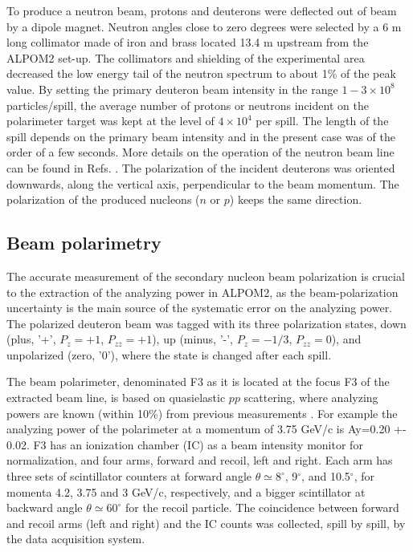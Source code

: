 \documentclass[epj]{svjour}
\begin{document}
To produce a neutron beam, protons and deuterons were deflected out of beam by a dipole magnet.  Neutron angles close to zero degrees were selected by a 6 m long collimator made of iron and brass located 13.4 m upstream from the ALPOM2 set-up. The collimators and shielding of the experimental area decreased the low energy tail of the neutron spectrum to about 1\% of 
the peak value.  By setting the primary deuteron beam intensity in the range $ {1-3\times 10^8}$ particles/spill, the average number of protons or neutrons incident on the polarimeter target was kept at the level of $4\times 10^4$ per spill. The length of the spill depends on the primary beam intensity and in the present case was of the order of a few seconds. More details on the operation of the neutron beam line can be found  in Refs. \cite{Kirillov:1996zf,Rukoyatkin:2001nd}.
The polarization of the incident deuterons was oriented downwards, along the vertical axis, perpendicular  to the beam momentum. The polarization of the produced nucleons ($n$ or $p$) keeps the same direction.
\subsection{Beam polarimetry}
The accurate measurement of the secondary nucleon beam polarization is crucial to the extraction of the analyzing power in ALPOM2, as the beam-polarization uncertainty is the main source of the systematic error on the analyzing power. The polarized deuteron beam was tagged with its three polarization states, down (plus, '+', $P_z=+1$, $P_{zz}=+1$), up (minus, '-', $P_z=-1/3$, $P_{zz}=0$), and unpolarized (zero, '0'), where the state is changed after each spill. 

The beam polarimeter, denominated F3 as it is located at the focus F3 of the extracted beam line, is based on quasielastic $pp$   scattering, where analyzing powers are known (within 10\%) from previous measurements \cite{Bystricky:1981}. For example the analyzing power of the polarimeter at a momentum of 3.75 GeV/c is Ay=0.20 +- 0.02. F3 has an ionization chamber (IC) as a beam intensity monitor for normalization, and four arms, forward and recoil, left and right. Each arm has three sets of scintillator counters at forward angle $\theta \simeq 8^\circ$,  9$^\circ$,  and 10.5$^\circ$, for momenta 4.2, 3.75 and 3 GeV/c, respectively,  and a bigger scintillator at backward angle $\theta \simeq 60^\circ$ for the recoil particle. The coincidence between forward and recoil arms (left and right) and the IC counts was collected, spill by spill, by the data acquisition system.
\end{document}
